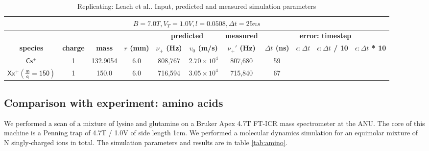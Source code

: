 \documentclass[10pt,conference,onecolumn]{IEEEtran}
\begin{document}
\begin{table}[htbp]
 \centering	  	  
 \caption{Replicating: Leach et al.\cite{Leach2009}. Input, predicted and measured simulation parameters}
\label{tab:leach}
\begin{tabular}{c|c|c|c|c|c|c|c|c|c|c}
 \hline \hline
  \multicolumn{11}{|c|}{$B = 7.0 T, V_T = 1.0 V, l = 0.0508, \Delta t = 25ns$} \\
 \hline \hline
 \multicolumn{4}{|c|}{ } & \multicolumn{2}{|c|}{\textbf{predicted}} & \textbf{measured} & \multicolumn{4}{|c|}{\textbf{error: timestep}} \\ 
 \hline
 \textbf{species} & \textbf{charge} & \textbf{mass} & \textbf{$r$ (mm)} & \textbf{$\nu_+$ (Hz)}  & \textbf{$v_0$ (m/s)} & \textbf{$\nu_+'$ (Hz)}  &  \textbf{$\Delta t$ (ns)} & \textbf{$\epsilon: \Delta t$} & \textbf{$\epsilon: \Delta t$ / 10} & \textbf{$\epsilon: \Delta t$ * 10}\\ 
 \hline
 $\mathsf{Cs^+}$                   & 1 & 132.9054 & 6.0 & 808,767 & $2.70 \times 10^4$ & 807,680 & 59 & \\
 $\mathsf{Xx^+ (\frac{m}{q} = 150 )}$ & 1 & 150.0 & 6.0 & 716,594 & $3.05 \times 10^4$ & 715,840 & 67 & \\
 \hline \hline
\end{tabular}
\end{table}

\subsection{Comparison with experiment: amino acids}
\label{sec:amino}

We performed a scan of a mixture of lysine and glutamine on a Bruker Apex 4.7T FT-ICR mass spectrometer at the ANU.
The core of this machine is a Penning trap of 4.7T / 1.0V of side length 1cm.
We performed a molecular dynamics simulation for an equimolar mixture of N singly-charged ions in total.
The simulation parameters and results are in table \ref{tab:amino}.
\end{document}

